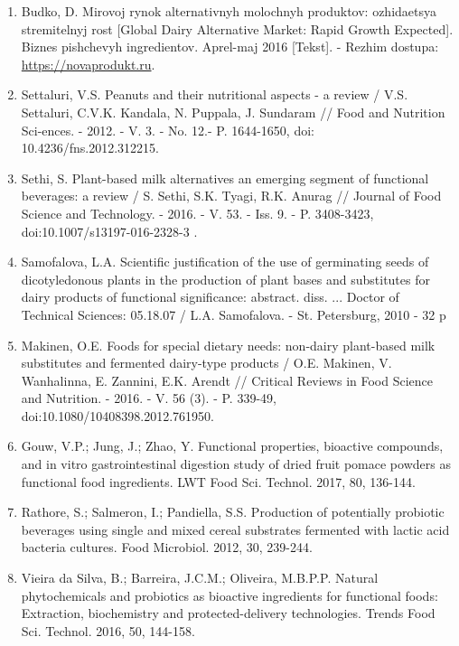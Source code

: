 \begin{enumerate}
\item
Bud\textquotesingle ko, D. Mirovoj rynok
al\textquotesingle ternativnyh molochnyh produktov: ozhidaetsya
stremitel\textquotesingle nyj rost {[}Global Dairy Alternative Market:
Rapid Growth Expected{]}. Biznes pishchevyh ingredientov.
Aprel\textquotesingle-maj 2016 {[}Tekst{]}. - Rezhim dostupa:
\href{https://novaprodukt.ru/ing/articles/non\_dairy\_milk/}{https://novaprodukt.ru}.

\item
Settaluri, V.S. Peanuts and their nutritional aspects - a review /
V.S. Settaluri, C.V.K. Kandala, N. Puppala, J. Sundaram // Food and
Nutrition Sci-ences. - 2012. - V. 3. - No. 12.- P. 1644-1650, doi:
10.4236/fns.2012.312215.

\item
Sethi, S. Plant-based milk alternatives an emerging segment of
functional beverages: a review / S. Sethi, S.K. Tyagi, R.K. Anurag //
Journal of Food Science and Technology. - 2016. - V. 53. - Iss. 9. -
P. 3408-3423, doi:10.1007/s13197-016-2328-3 .

\item
Samofalova, L.A. Scientific justification of the use of germinating
seeds of dicotyledonous plants in the production of plant bases and
substitutes for dairy products of functional significance: abstract.
diss. ... Doctor of Technical Sciences: 05.18.07 / L.A. Samofalova. -
St. Petersburg, 2010 - 32 p

\item
Makinen, O.E. Foods for special dietary needs: non-dairy plant-based
milk substitutes and fermented dairy-type products / O.E. Makinen, V.
Wanhalinna, E. Zannini, E.K. Arendt // Critical Reviews in Food Science
and Nutrition. - 2016. - V. 56 (3). - P. 339-49,
doi:10.1080/10408398.2012.761950.

\item
Gouw, V.P.; Jung, J.; Zhao, Y. Functional properties, bioactive
compounds, and in vitro gastrointestinal digestion study of dried fruit
pomace powders as functional food ingredients. LWT Food Sci. Technol.
2017, 80, 136-144.

\item
Rathore, S.; Salmeron, I.; Pandiella, S.S. Production of potentially
probiotic beverages using single and mixed cereal substrates fermented
with lactic acid bacteria cultures. Food Microbiol. 2012, 30, 239-244.

\item
Vieira da Silva, B.; Barreira, J.C.M.; Oliveira, M.B.P.P. Natural
phytochemicals and probiotics as bioactive ingredients for functional
foods: Extraction, biochemistry and protected-delivery technologies.
Trends Food Sci. Technol. 2016, 50, 144-158.


\end{enumerate}
